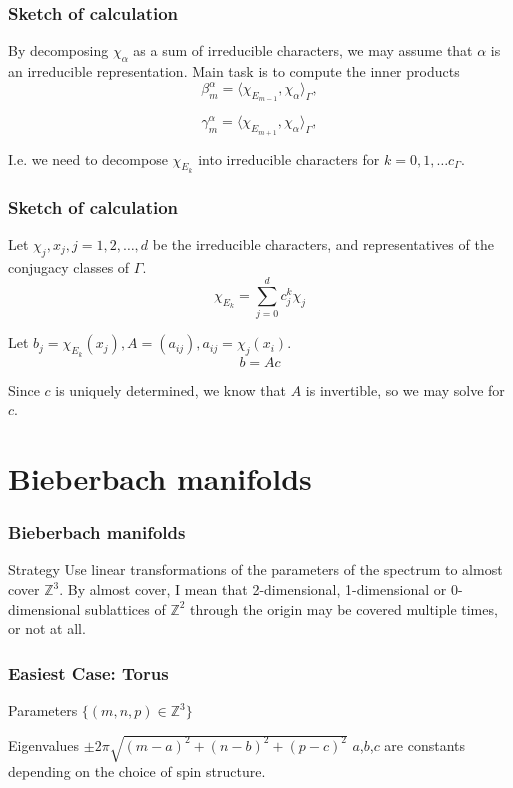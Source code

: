 \documentclass{beamer}
\def\Z{{\mathbb Z}}
\begin{document}
\begin{frame}
\frametitle{Sketch of calculation}
By decomposing $\chi_{\alpha}$ as a sum of irreducible characters, we may assume that $\alpha$ is an irreducible representation. Main task is to compute the inner products
\[
\beta_m^{\alpha} = \langle \chi_{E_{m-1}}, \chi_{\alpha} \rangle_{\Gamma},
\]

\[
\gamma_m^{\alpha} = \langle \chi_{E_{m+1}}, \chi_{\alpha} \rangle_{\Gamma},
\]

\pause

\begin{block}{}
	I.e. we need to decompose $\chi_{E_k}$ into irreducible characters for $k = 0 ,1 ,\ldots c_{\Gamma}$.
\end{block}
\end{frame}

\begin{frame}
\frametitle{Sketch of calculation}
Let $\chi_j, x_j, j = 1,2,\ldots, d$ be the irreducible characters, and representatives of the conjugacy classes of $\Gamma$.
\[
\chi_{E_k} = \sum_{j=0}^d c_j^k \chi_j
\]

Let $b_j = \chi_{E_k}(x_j), A = (a_{ij}), a_{ij} = \chi_j(x_i)$.
\[
b = A c
\]

Since $c$ is uniquely determined, we know that $A$ is invertible, so we may solve for $c$.
\end{frame}

\section{Bieberbach manifolds}

\begin{frame}
  \frametitle{Bieberbach manifolds}

  \begin{block}{Strategy}
  Use linear transformations of the parameters of the spectrum to almost cover $\Z ^3$.  By almost cover, I mean that 2-dimensional, 1-dimensional or 0-dimensional sublattices of $\Z^2$ through the origin may be covered multiple times, or not at all.
  \end{block}
\end{frame}

\begin{frame}
  \frametitle{Easiest Case: Torus}
  \begin{block}{Parameters}
    $\{(m,n,p) \in \Z ^3 \}$
  \end{block}
  \begin{block}{Eigenvalues}
    $\pm 2 \pi \sqrt{(m-a)^2 + (n-b)^2 + (p-c)^2}$
    $a$,$b$,$c$ are constants depending on the choice of spin structure.
  \end{block}
\end{frame}
\end{document}

